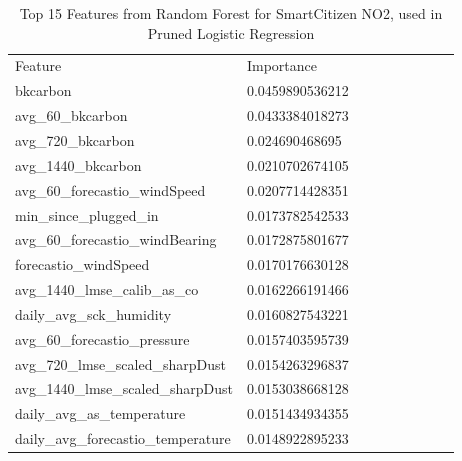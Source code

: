\begin{table}[H]
\centering
\begin{tabular}{lllllllll}
\\
\\
\toprule
Feature & Importance \\
\midrule

bkcarbon & 0.0459890536212 \\
avg\_60\_bkcarbon & 0.0433384018273 \\
avg\_720\_bkcarbon & 0.024690468695 \\
avg\_1440\_bkcarbon & 0.0210702674105 \\
avg\_60\_forecastio\_windSpeed & 0.0207714428351 \\
min\_since\_plugged\_in & 0.0173782542533 \\
avg\_60\_forecastio\_windBearing & 0.0172875801677 \\
forecastio\_windSpeed & 0.0170176630128 \\
avg\_1440\_lmse\_calib\_as\_co & 0.0162266191466 \\
daily\_avg\_sck\_humidity & 0.0160827543221 \\
avg\_60\_forecastio\_pressure & 0.0157403595739 \\
avg\_720\_lmse\_scaled\_sharpDust & 0.0154263296837 \\
avg\_1440\_lmse\_scaled\_sharpDust & 0.0153038668128 \\
daily\_avg\_as\_temperature & 0.0151434934355 \\
daily\_avg\_forecastio\_temperature & 0.0148922895233 \\
\bottomrule
\end{tabular}
\label{tab:sck_no2_randomforest_features}
\caption{Top 15 Features from Random Forest for SmartCitizen NO2, used in Pruned Logistic Regression}
\end{table}




